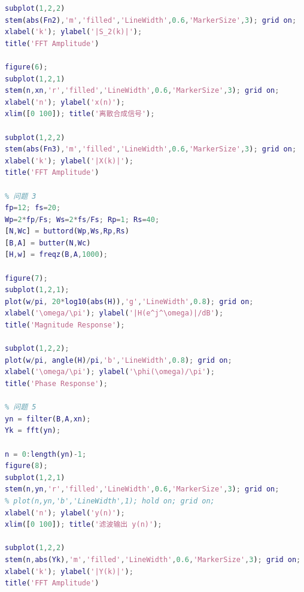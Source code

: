 \documentclass[12pt,AutoFakeBold]{article}
\begin{document}
\begin{appendices}
\begin{lstlisting}[language=Matlab]
subplot(1,2,2)
stem(abs(Fn2),'m','filled','LineWidth',0.6,'MarkerSize',3); grid on;
xlabel('k'); ylabel('|S_2(k)|');
title('FFT Amplitude')

figure(6);
subplot(1,2,1)
stem(n,xn,'r','filled','LineWidth',0.6,'MarkerSize',3); grid on;
xlabel('n'); ylabel('x(n)');
xlim([0 100]); title('离散合成信号');

subplot(1,2,2)
stem(abs(Fn3),'m','filled','LineWidth',0.6,'MarkerSize',3); grid on;
xlabel('k'); ylabel('|X(k)|');
title('FFT Amplitude')

% 问题 3
fp=12; fs=20;
Wp=2*fp/Fs; Ws=2*fs/Fs; Rp=1; Rs=40;
[N,Wc] = buttord(Wp,Ws,Rp,Rs)
[B,A] = butter(N,Wc)
[H,w] = freqz(B,A,1000);

figure(7);
subplot(1,2,1);
plot(w/pi, 20*log10(abs(H)),'g','LineWidth',0.8); grid on;
xlabel('\omega/\pi'); ylabel('|H(e^j^\omega)|/dB');
title('Magnitude Response');

subplot(1,2,2);
plot(w/pi, angle(H)/pi,'b','LineWidth',0.8); grid on;
xlabel('\omega/\pi'); ylabel('\phi(\omega)/\pi');
title('Phase Response');

% 问题 5
yn = filter(B,A,xn);
Yk = fft(yn);

n = 0:length(yn)-1;
figure(8);
subplot(1,2,1)
stem(n,yn,'r','filled','LineWidth',0.6,'MarkerSize',3); grid on;
% plot(n,yn,'b','LineWidth',1); hold on; grid on;
xlabel('n'); ylabel('y(n)');
xlim([0 100]); title('滤波输出 y(n)');

subplot(1,2,2)
stem(n,abs(Yk),'m','filled','LineWidth',0.6,'MarkerSize',3); grid on;
xlabel('k'); ylabel('|Y(k)|');
title('FFT Amplitude')
\end{lstlisting}

 

\end{appendices}
\end{document}
